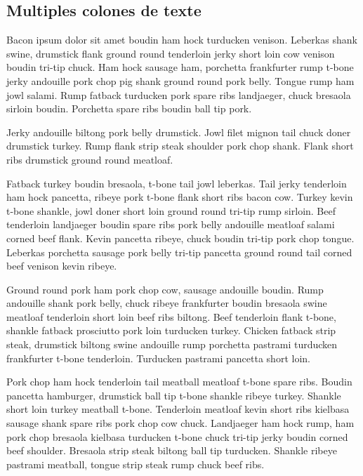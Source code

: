 \subsection{Multiples colones de texte}
\begin{multicols}{2}


Bacon ipsum dolor sit amet boudin ham hock turducken venison. Leberkas shank swine, drumstick flank ground round tenderloin jerky short loin cow venison boudin tri-tip chuck. Ham hock sausage ham, porchetta frankfurter rump t-bone jerky andouille pork chop pig shank ground round pork belly. Tongue rump ham jowl salami. Rump fatback turducken pork spare ribs landjaeger, chuck bresaola sirloin boudin. Porchetta spare ribs boudin ball tip pork.

Jerky andouille biltong pork belly drumstick. Jowl filet mignon tail chuck doner drumstick turkey. Rump flank strip steak shoulder pork chop shank. Flank short ribs drumstick ground round meatloaf.

Fatback turkey boudin bresaola, t-bone tail jowl leberkas. Tail jerky tenderloin ham hock pancetta, ribeye pork t-bone flank short ribs bacon cow. Turkey kevin t-bone shankle, jowl doner short loin ground round tri-tip rump sirloin. Beef tenderloin landjaeger boudin spare ribs pork belly andouille meatloaf salami corned beef flank. Kevin pancetta ribeye, chuck boudin tri-tip pork chop tongue. Leberkas porchetta sausage pork belly tri-tip pancetta ground round tail corned beef venison kevin ribeye.

Ground round pork ham pork chop cow, sausage andouille boudin. Rump andouille shank pork belly, chuck ribeye frankfurter boudin bresaola swine meatloaf tenderloin short loin beef ribs biltong. Beef tenderloin flank t-bone, shankle fatback prosciutto pork loin turducken turkey. Chicken fatback strip steak, drumstick biltong swine andouille rump porchetta pastrami turducken frankfurter t-bone tenderloin. Turducken pastrami pancetta short loin.

Pork chop ham hock tenderloin tail meatball meatloaf t-bone spare ribs. Boudin pancetta hamburger, drumstick ball tip t-bone shankle ribeye turkey. Shankle short loin turkey meatball t-bone. Tenderloin meatloaf kevin short ribs kielbasa sausage shank spare ribs pork chop cow chuck. Landjaeger ham hock rump, ham pork chop bresaola kielbasa turducken t-bone chuck tri-tip jerky boudin corned beef shoulder. Bresaola strip steak biltong ball tip turducken. Shankle ribeye pastrami meatball, tongue strip steak rump chuck beef ribs.
\end{multicols}
